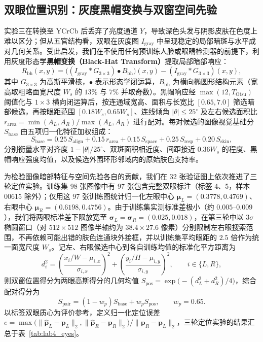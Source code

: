 \subsection{双眼位置识别：灰度黑帽变换与双窗空间先验}

实验三在转换至 YCrCb 后丢弃了亮度通道 $Y$，导致深色头发与阴影皮肤在色度上难以区分；但从五官结构看，双眼在灰度图 $I_{\text{gray}}$ 中呈现稳定的局部暗斑与水平成对几何关系\cite{hsu2002face}。受此启发，我们在不使用任何预训练人脸或眼睛检测器的前提下，利用灰度形态学\textbf{黑帽变换（Black-Hat Transform）}提取局部暗部响应：
\begin{equation}
R_{\text{bh}}(x,y) = \bigl((I_{\text{gray}} * G_{3\times3}) \bullet B_{\text{bh}}\bigr)(x,y) - (I_{\text{gray}} * G_{3\times3})(x,y),
\label{eq:blackhat}
\end{equation}
其中 $G_{3\times3}$ 为高斯平滑核，$\bullet$ 表示形态学闭运算，$B_{\text{bh}}$ 为横向椭圆形结构元素（宽高取粗略面宽尺度 $W_s$ 的 $13\%$ 与 $7\%$ 并取奇数）。黑帽响应经 $\max(12, T_{\text{Otsu}})$ 阈值化与 $1\times3$ 横向闭运算后，按连通域宽高、面积与长宽比 $[0.65, 7.0]$ 筛选暗部候选，再按眼距范围 $[0.18W_s, 0.65W_s]$、连线倾角 $|\theta|\le 25^\circ$ 及左右候选面积比 $r_{\text{area}}=\min(A_L,A_R)/\max(A_L,A_R)$ 进行配对。每对候选的图像视觉基础分 $S_{\text{base}}$ 由五项归一化特征加权组成：
\begin{equation}
S_{\text{base}} = 0.25\,S_{\text{align}} + 0.15\,r_{\text{area}} + 0.15\,S_{\text{space}} + 0.25\,S_{\text{resp}} + 0.20\,S_{\text{skin}},
\label{eq:eyebase}
\end{equation}
分别衡量水平对齐度 $1-|\theta|/25^\circ$、双斑面积相近度、间距接近 $0.36W_s$ 的程度、黑帽响应强度均值，以及候选外围环形邻域内的原始肤色支持率。

为检验图像暗部特征与空间先验各自的贡献，我们在 32 张验证图上依次推进了三轮定位实验。训练集 98 张图像中有 97 张包含完整双眼标注（标签 4、5，样本 00615 除外）；仅用这 97 张训练图统计归一化左眼中心 $\boldsymbol{\mu}_L=(0.3778, 0.4769)$、右眼中心 $\boldsymbol{\mu}_R=(0.6198, 0.4756)$。由于训练集实测标准差极小（约 $0.005\text{--}0.009$），我们将两眼标准差下限放宽至 $\boldsymbol{\sigma}_L=\boldsymbol{\sigma}_R=(0.025, 0.018)$，在第三轮中以 $3\sigma$ 椭圆窗口（对 $512\times512$ 图像半轴约为 $38.4\times27.6$ 像素）分别限制左右眼搜索范围，不再依赖可能出错的肤色连通块外接框，并以训练集平均眼距的 $2.5$ 倍作为统一面宽尺度 $W_s$。记左、右眼候选中心到各自训练均值的标准化平方距离为
\begin{equation}
d_i^2 = \left(\frac{x_i/W - \mu_{i,x}}{\sigma_{i,x}}\right)^2 + \left(\frac{y_i/H - \mu_{i,y}}{\sigma_{i,y}}\right)^2, \qquad i\in\{L,R\},
\label{eq:eyedist}
\end{equation}
则双窗位置得分为两眼高斯得分的几何均值 $S_{\text{pos}}=\exp\bigl(-(d_L^2+d_R^2)/4\bigr)$，综合配对得分为
\begin{equation}
S_{\text{pair}} = (1 - w_p)S_{\text{base}} + w_p S_{\text{pos}}, \qquad w_p = 0.65.
\label{eq:eyepairscore}
\end{equation}
以标签双眼质心为评价参考，定义归一化定位误差 $e = \max\bigl(\|\hat{\mathbf{p}}_L-\mathbf{p}_L\|_2, \|\hat{\mathbf{p}}_R-\mathbf{p}_R\|_2\bigr) / \|\mathbf{p}_R-\mathbf{p}_L\|_2$，三轮定位实验的结果汇总于表~\ref{tab:lab4_eyes}。

